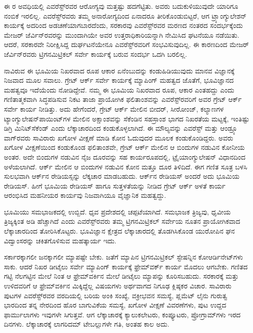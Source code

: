 ಈ ರ ಅವಧಿಯಲ್ಲಿ ಎವರೆಸ್ಟ್​ರವರ ಆರೋಗ್ಯವು ಮತ್ತಷ್ಟು ಹದಗೆಟ್ಟಿತು. ಅವರು ಬದುಕುಳಿಯುವುದೇ ಯಾರಿಗೂ ನಂಬಿಕೆ ಇರಲಿಲ್ಲ. ಎವರೆಸ್ಟ್​ರವರು ತಮ್ಮ ಅನಾರೋಗ್ಯದಿಂದ ಏನಾದರೂ ತೀರಿಕೊಂಡುಬಿಟ್ಟರೆ, ಆಗ ಟ್ರ್ಯಾಂಗ್ಯುಲೇಶನ್​ ಕಾರ್ಯಕ್ಕೆ ಅದರಿಂದ ಅಡಚಣೆಯಾಗಬಾರದೆಂದು, ಸರಕಾರವು ಎವರೆಸ್ಟ್​ರವರ ಮರಣದ ನಂತರದ ಸಂದರ್ಭಕ್ಕೆಂದು ಮೇಜರ್​ ಜೆರ್ವಿನ್​ರವರನ್ನು ಮುಂದಾಗಿಯೇ ಅವರ ಉತ್ತರಾಧಿಕಾರಿಯನ್ನಾಗಿ ನೇಮಿಸಿದ ಘಟನೆಯೂ ನಡೆಯಿತು. ಆದರೆ, ಸರಕಾರವೇ ನಿರೀಕ್ಷಿಸಿದ್ದ ದುರ್ಘಟನೆಯೇನೂ ಎವರೆಸ್ಟ್​\break ರವರಿಗೆ ಸಂಭವಿಸುವುದಿಲ್ಲ. ಈ ಕಾರಣದಿಂದ ಮೇಜರ್​ ಜೆರ್ವಿನ್​ರವರು ಟ್ರಿಗನಮಿಟ್ರಿಕಲ್​ ಸರ್ವೇ ಕಾರ್ಯಕ್ಕೆ ಬರುವ ಸಂದರ್ಭ ಒದಗಿ ಬರಲಿಲ್ಲ.

ನಾವಿರುವ ಈ ಭೂಮಿಯ ನಿಖರವಾದ ರೂಪ ಆಕಾರ ಏನೆಂಬುದನ್ನು ಕಂಡುಹಿಡಿಯುವುದು ಮಾನವ ವಿಜ್ಞಾನಕ್ಕೆ ನಿಜವಾದ ಮೂಲ ಸವಾಲು. ಗ್ರೇಟ್​ ಆರ್ಕ್ ಸರ್ವೇ ಕಾರ್ಯಕ್ಕೆ ಮ್ಯಾಪಿಂಗ್​ ಮಹತ್ವದ ಜೊತೆಗೆ, ಭೂವಿಜ್ಞಾನದ ಮಹತ್ವವೂ ಇದೆಯೆಂದು ನೋಡಿದ್ದೇವೆ. ನಮ್ಮ ಈ ಭೂಮಿಯ ನಿಖರವಾದ ರೂಪ, ಆಕಾರ ಎಂತಹದ್ದು ಎಂದು ಗಣಿತಾತ್ಮಕವಾಗಿ ಸಿದ್ಧಪಡಿಸುವ ನಿಕಟ ತಾಜಾ ಪ್ರಾಯೋಗಿಕ ಫಲಿತಾಂಶವನ್ನು ಎವರೆಸ್ಟ್​ರವರಿಗೆ ಅವರ ಗ್ರೇಟ್​ ಆರ್ಕ್ ಸರ್ವೇ ಕಾರ್ಯ ನೀಡಿತ್ತು. ಅದು ಹೇಗೆಂದರೆ, ಗ್ರೇಟ್​ ಆರ್ಕ್ ಮೇಲಿನ ಬೀದರ್​, ಸೀರೋಂಜ್​, ಕಲ್ಯಾಣಗಳ ಟ್ಯಾಂಗ್ಯುಲೇಷನ್​ ಪಾಯಿಂಟ್​ಗಳ ಮೇಲಿನ ಅಕ್ಷಾಂಶವನ್ನು ಸೆಕೆಂಡಿನ ಸಹಸ್ರಾಂಶ ಭಾಗದ ನಿಖರತೆಯ ಮಟ್ಟಕ್ಕೆ, ಇಂತಿಷ್ಟು ಡಿಗ್ರಿ ಮಿನಿಟ್​ ಸೆಕೆಂಡ್​ ಎಂದು ಲೆಕ್ಕಾಚಾರದಿಂದ ಕಂಡುಕೊಳ್ಳಲಾಗಿದೆ. ಈ ಮೌಲ್ಯವನ್ನು ಎವರೆಸ್ಟ್​ ಮತ್ತು ಆಂಡ್ರ್ಯೂ ವಾಗ್​ರವರು ಸಾವಿರಾರು ಖಗೋಳ ವೀಕ್ಷಣೆ ಮಾಡಿ ಕೋನ ಓದುವುದರ ಮೂಲಕ ಕಂಡುಕೊಂಡಿದ್ದರು. ಅವರು ಖಗೋಳ ವೀಕ್ಷಣೆಯಿಂದ ಕಂಡುಕೊಂಡ ಫಲಿತಾಂಶವೇ, ಗ್ರೇಟ್​ ಆರ್ಕ್ ಮೇಲಿನ ಆ ಬಿಂದುಗಳ ನಡುವಿನ ಕೋನೀಯ ಅಂತರ. ಅದೇ ಬಿಂದುಗಳ ನಡುವಿನ ನೈಜ ದೂರವನ್ನು ಸಹ ಕಾರ್ಯರೂಪದಲ್ಲಿ, ಟ್ರೈಯಾಂಗ್ಯುಲೇಷನ್​ ವಿಧಾನದಿಂದ ಅಳೆಯಲಾಗಿದೆ. ಆರ್ಕ್ ಮೇಲಿನ ಆ ಬಿಂದುಗಳ ನಡುವಿನ ಕೋನ ಮತ್ತೂ ದೂರ ತಿಳಿದಿದೆ. ಈಗ ಗಣಿತ ಸೂತ್ರ ಬಳಸಿ ಸುಲಭವಾಗಿ ಆರ್ಕ್‌ನ ರೇಡಿಯಸ್ಸನ್ನು ಲೆಕ್ಕಚಾರ ಮಾಡಬಹುದು. ಆರ್ಕ್‌ನ ರೇಡಿಯಸ್​ ಅಂದರೆ ಅದು ಭೂಮಿಯ ರೇಡಿಯಸ್​. ಹೀಗೆ ಭೂಮಿಯ ರೇಡಿಯಸ್​ ಹಾಗೂ ಸುತ್ತಳತೆಯನ್ನು ನೀಡಿದ ಗ್ರೇಟ್​ ಆರ್ಕ್ ಅಳತೆ ಕಾರ್ಯ ಆರಂಭಿಸಿದ ಮಹನೀಯರ ಕಾರ್ಯವು ನಿಜವಾಗಿಯೂ ವೈಜ್ಞಾನಿಕ ಮಹತ್ವದ್ದು.

ಭೂಮಿಯು ಸಮಭಾಜಕದಲ್ಲಿ ಉಬ್ಬಿದೆ. ಧೃವ ಪ್ರದೇಶದಲ್ಲಿ ಚಪ್ಪಟೆಯಾಗಿದೆ. ಸಮಭಾಜಕ ತ್ರಿಜ್ಯವು, ಧೃವೀಯ ತ್ರಿಜ್ಯಕ್ಕಿಂತ  ಅಡಿ ಹೆಚ್ಚಾಗಿದೆ ಎಂದು ಎವರೆಸ್ಟ್​ರವರು ತಮ್ಮ ಟ್ರಿಗನಮಿಟ್ರಿಕಲ್​ ಸರ್ವೇಯ ನೂತನ ಪ್ರಾಯೋಗಿಕವಾದ ಲೆಕ್ಕಾಚಾರದಿಂದ ತೋರಿಸಿಕೊಟ್ಟರು. ಭೂವಿಜ್ಞಾನ ಕ್ಷೇತ್ರದ ಲೆಕ್ಕಾಚಾರದಲ್ಲಿ ತೊಡಗಿಸಿಕೊಂಡ ಯುರೋಪಿನ ಘನ ವಿದ್ವಾಂಸರನ್ನು ಚಕಿತಗೊಳಿಸುವ ಮಹತ್ಕಾರ್ಯ ಇದು.

ಸರ್ಕಾರಕ್ಕಾಗಲೀ ಜನಕ್ಕಾಗಲೀ ಮ್ಯಾಪಷ್ಟೇ ಬೇಕು. ಜತೆಗೆ ಮ್ಯಾಪಿನ ಟ್ರಿಗನಮಿಟ್ರಿಕಲ್​ ಸ್ಟೇಷನ್ನಿನ ಕೋಆರ್ಡಿನೇಟ್​ಗಳು ಸಾಕು. ಆದರೆ ನಿಖರ ಡೀಟೈಲು ಸರ್ವೇ ಮ್ಯಾಪಿಂಗ್​ ಕಾರ್ಯಕ್ಕೆ ಫ್ರೇಮ್‌ವರ್ಕ್ ಕಾರ್ಯ ಮೊದಲು ಆಗಬೇಕು. ಗಣಿತದ ಗಟ್ಟಿ ನೆಲಗಟ್ಟಿನ ಮೇಲೆ ನಿಂತ ಆ ಫ್ರೇಮ್‌ವರ್ಕಿನ ಮೇಲೆ ಡೀಟೈಲು ಮ್ಯಾಪನ್ನು ಕೂರಿಸಬಹುದು. ಸರಕಾರಕ್ಕೆ ಮತ್ತು ಉಳಿದವರಿಗೆ ಆ ಫ್ರೇಮ್‌ವರ್ಕಿನ ಮಿಕ್ಕಿದ್ದೆಲ್ಲ ವಿಷಯಗಳು ಅರ್ಥವಾಗದ ನಿಗೂಢ ಕ್ಲಿಷ್ಠಕರ ವಿಚಾರ. ಸಾವಿರಾರು ಪುಟಗಳ ಎವರೆಸ್ಟ್​ರವರ ವರದಿಯಲ್ಲಿ ಬರಿಯ ಅಂಕಿ ಸಂಖ್ಯೆ, ವಕ್ರೀಭವನ ಸಮಸ್ಯೆ, ಪ್ಲಮೆಟ್​ ಲೈನು ಗುರುತ್ವ ಭಾರದಿಂದ ತನ್ನ ನೇರದಿಂದ ಹೊರ ಬಾಗುವಿಕೆಯ ಸಮಸ್ಯೆ, ಖಗೋಳ ವೀಕ್ಷಣೆ ವಿವರಣೆಗಳು, ಪುಟ ಉದ್ದದ ಫಾರ್ಮುಲಾಗಳು ಇವುಗಳೇ ಸಿಗುತ್ತವೆ. ಆಗ ಲೆಕ್ಕಾಚಾರಕ್ಕೆ ಕ್ಯಾಲುಕಲೇಟರು, ಕಂಪ್ಯೂಟರು, ಪ್ರೋಗ್ರಾಮ್‌ಗಳು ಇರದ ದಿನಗಳು. ಲೆಕ್ಕಾಚಾರಕ್ಕೆ ಲಾಗರಿದಮ್ ಟೇಬಲ್ಲುಗಳೇ ಗತಿ, ಅಂತಹ ಕಾಲ ಅದು.

